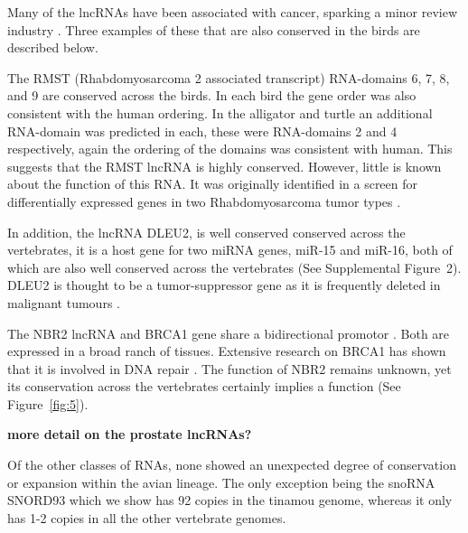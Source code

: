 \documentclass[10pt]{bmc_article}
\newenvironment{bmcformat}{\begin{raggedright}\baselineskip20pt\sloppy\setboolean{publ}{false}}{\end{raggedright}\baselineskip20pt\sloppy}
\begin{document}
\begin{bmcformat}
Many of the lncRNAs have been associated with cancer, sparking a minor
review industry \cite{Prensner:2011,Spizzo:2012}. Three examples of
these that are also conserved in the birds are described below.

The RMST (Rhabdomyosarcoma 2 associated transcript) RNA-domains 6, 7,
8, and 9 are conserved across the birds. In each bird the gene order
was also consistent with the human ordering. In the alligator and
turtle an additional RNA-domain was predicted in each, these were
RNA-domains 2 and 4 respectively, again the ordering of the domains
was consistent with human. This suggests that the RMST lncRNA is
highly conserved. However, little is known about the function of this
RNA. It was originally identified in a screen for differentially
expressed genes in two Rhabdomyosarcoma tumor types \cite{Chan:2002}.

In addition, the lncRNA DLEU2, is well conserved conserved across the
vertebrates, it is a host gene for two miRNA genes, miR-15 and miR-16,
both of which are also well conserved across the vertebrates (See
Supplemental Figure~2). DLEU2 is thought to be a tumor-suppressor gene
as it is frequently deleted in malignant tumours
\cite{Lerner:2009,Klein:2010}.


The NBR2 lncRNA and BRCA1 gene share a bidirectional promotor
\cite{Xu:1997}. Both are expressed in a broad ranch of
tissues. Extensive research on BRCA1 has shown that it is involved in
DNA repair \cite{Moynahan:1999}. The function of NBR2 remains unknown,
yet its conservation across the vertebrates certainly implies a
function (See Figure~\ref{fig:5}).


{\bf more detail on the prostate lncRNAs?}

Of the other classes of RNAs, none showed an unexpected degree of
conservation or expansion within the avian lineage. The only exception
being the snoRNA SNORD93 which we show has 92 copies in the tinamou
genome, whereas it only has 1-2 copies in all the other vertebrate
genomes. 




\end{bmcformat}
\end{document}

